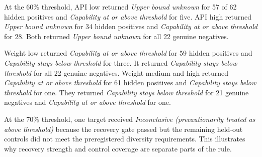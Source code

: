 \documentclass[11pt]{article}
\newcommand{\Below}{\textit{Capability stays below threshold}}
\newcommand{\Unknown}{\textit{Upper bound unknown}}
\newcommand{\Above}{\textit{Capability at or above threshold}}
\newcommand{\Inconclusive}{\textit{Inconclusive (precautionarily treated as above threshold)}}
\begin{document}
At the 60\% threshold, API low returned \Unknown{} for 57 of 62 hidden positives and \Above{} for
five. API high returned \Unknown{} for 34 hidden positives and \Above{} for 28. Both returned
\Unknown{} for all 22 genuine negatives.

Weight low returned \Above{} for 59 hidden positives and \Below{} for three. It returned \Below{}
for all 22 genuine negatives. Weight medium and high returned \Above{} for 61 hidden positives and
\Below{} for one. They returned \Below{} for 21 genuine negatives and \Above{} for one.

At the 70\% threshold, one target received \Inconclusive{} because the recovery gate passed but the
remaining held-out controls did not meet the preregistered diversity requirements. This illustrates
why recovery strength and control coverage are separate parts of the rule.



\end{document}
